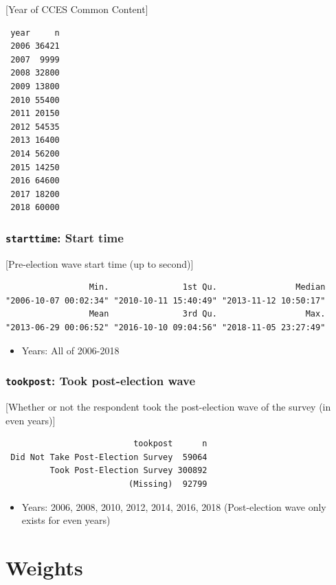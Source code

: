 \documentclass[10pt,article,oneside]{memoir}
\theoremstyle{definition}
\begin{document}
{[}Year of CCES Common Content{]}

\begin{verbatim}
 year     n
 2006 36421
 2007  9999
 2008 32800
 2009 13800
 2010 55400
 2011 20150
 2012 54535
 2013 16400
 2014 56200
 2015 14250
 2016 64600
 2017 18200
 2018 60000
\end{verbatim}

\subsubsection{\texorpdfstring{\texttt{starttime}: Start
time}{starttime: Start time}}\label{starttime-start-time}

{[}Pre-election wave start time (up to second){]}

\begin{verbatim}
                 Min.               1st Qu.                Median 
"2006-10-07 00:02:34" "2010-10-11 15:40:49" "2013-11-12 10:50:17" 
                 Mean               3rd Qu.                  Max. 
"2013-06-29 00:06:52" "2016-10-10 09:04:56" "2018-11-05 23:27:49" 
\end{verbatim}

\begin{itemize}
\tightlist
\item
  Years: All of 2006-2018
\end{itemize}

\subsubsection{\texorpdfstring{\texttt{tookpost}: Took post-election
wave}{tookpost: Took post-election wave}}\label{tookpost-took-post-election-wave}

{[}Whether or not the respondent took the post-election wave of the
survey (in even years){]}

\begin{verbatim}
                          tookpost      n
 Did Not Take Post-Election Survey  59064
         Took Post-Election Survey 300892
                         (Missing)  92799
\end{verbatim}

\begin{itemize}
\tightlist
\item
  Years: 2006, 2008, 2010, 2012, 2014, 2016, 2018 (Post-election wave
  only exists for even years)
\end{itemize}

\section{Weights}\label{weights}
\end{document}
